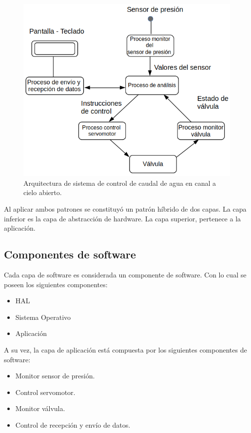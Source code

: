\begin{figure}
\centering
\includegraphics[scale=.65]{./Figures/ArquitecturaSoftware.png}
\caption{Arquitectura de sistema de control de caudal de agua en canal a cielo abierto.}
\label{fig:Arquitectura de software}
\end{figure}

Al aplicar ambos patrones se constituyó un patrón híbrido de dos capas. La capa inferior es la capa de abstracción de hardware. La capa superior, pertenece a la aplicación.

\subsection{Componentes de software}
\label{subsec:Componentes de software}
Cada capa de software es considerada un componente de software. Con lo cual se poseen los siguientes componentes:

\begin{itemize}
\item HAL
\item Sistema Operativo
\item Aplicación
\end{itemize}

A su vez, la capa de aplicación está compuesta por los siguientes componentes de software:

\begin{itemize}
\item Monitor sensor de presión.
\item Control servomotor.
\item Monitor válvula.
\item Control de recepción y envío de datos.
\end{itemize}

